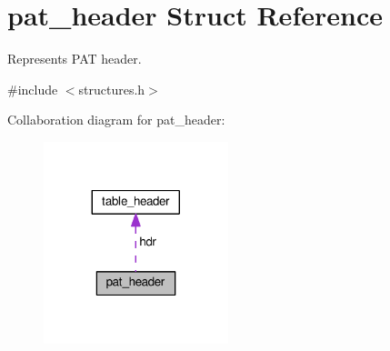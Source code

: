 \hypertarget{structpat__header}{}\section{pat\+\_\+header Struct Reference}
\label{structpat__header}


Represents P\+AT header.  




{\ttfamily \#include $<$structures.\+h$>$}



Collaboration diagram for pat\+\_\+header\+:\nopagebreak
\begin{figure}[H]
\begin{center}
\leavevmode
\includegraphics[width=152pt]{structpat__header__coll__graph}
\end{center}
\end{figure}
